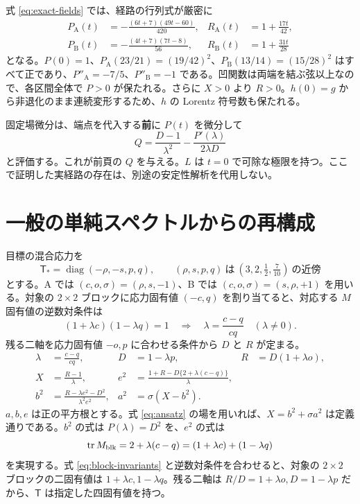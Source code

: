 \documentclass[11pt,a4paper]{article}
\newcommand{\diag}{\operatorname{diag}}
\newcommand{\Tmix}{\mathsf T}
\begin{document}
式 \eqref{eq:exact-fields} では、経路の行列式が厳密に
\begin{equation}\label{eq:exact-paths}
\begin{aligned}
P_{\mathrm A}(t)&=-\frac{(6t+7)(49t-60)}{420},&R_{\mathrm A}(t)&=1+\frac{17t}{42},\\
P_{\mathrm B}(t)&=-\frac{(4t+7)(7t-8)}{56},&R_{\mathrm B}(t)&=1+\frac{31t}{28}
\end{aligned}
\end{equation}
となる。$P(0)=1$、$P_{\mathrm A}(23/21)=(19/42)^2$、$P_{\mathrm B}(13/14)=(15/28)^2$ はすべて正であり、$P''_{\mathrm A}=-7/5$、$P''_{\mathrm B}=-1$ である。凹関数は両端を結ぶ弦以上なので、各区間全体で $P>0$ が保たれる。さらに $X>0$ より $R>0$。$h(0)=g$ から非退化のまま連続変形するため、$h$ の Lorentz 符号数も保たれる。

固定場微分は、端点を代入する\textbf{前}に $P(t)$ を微分して
\begin{equation}\label{eq:Q}
Q=\frac{D-1}{\lambda^2}-\frac{P'(\lambda)}{2\lambda D}
\end{equation}
と評価する。これが前頁の $Q$ を与える。$L$ は $t=0$ で可除な極限を持つ。ここで証明した実経路の存在は、別途の安定性解析を代用しない。

\newpage
\section{一般の単純スペクトルからの再構成}
目標の混合応力を
\begin{equation}\label{eq:targetgeneral}
\Tmix_* =\diag(-\rho,-s,p,q),\qquad
(\rho,s,p,q)\ \text{は}\ (3,2,\tfrac12,\tfrac7{10})\ \text{の近傍}
\end{equation}
とする。A では $(c,o,\sigma)=(\rho,s,-1)$、B では $(c,o,\sigma)=(s,\rho,+1)$ を用いる。対象の $2\times2$ ブロックに応力固有値 $(-c,q)$ を割り当てると、対応する $M$ 固有値の逆数対条件は
\begin{equation}\label{eq:reciprocal}
(1+\lambda c)(1-\lambda q)=1
\quad\Longrightarrow\quad
\lambda=\frac{c-q}{cq}\quad(\lambda\ne0).
\end{equation}
残る二軸を応力固有値 $-o,p$ に合わせる条件から $D$ と $R$ が定まる。
\begin{equation}\label{eq:reconstruction}
\boxed{\begin{aligned}
\lambda&=\frac{c-q}{cq},&D&=1-\lambda p,&R&=D(1+\lambda o),\\
X&=\frac{R-1}{\lambda},&
e^2&=\frac{1+R-D\{2+\lambda(c-q)\}}{\lambda},\\
b^2&=\frac{R-\lambda e^2-D^2}{\lambda^2e^2},&
a^2&=\sigma(X-b^2).
\end{aligned}}
\end{equation}
$a,b,e$ は正の平方根とする。式 \eqref{eq:ansatz} の場を用いれば、$X=b^2+\sigma a^2$ は定義通りである。$b^2$ の式は $P(\lambda)=D^2$ を、$e^2$ の式は
\begin{equation}\label{eq:trace-target}
\operatorname{tr}M_{\rm blk}=2+\lambda(c-q)
=(1+\lambda c)+(1-\lambda q)
\end{equation}
を実現する。式 \eqref{eq:block-invariants} と逆数対条件を合わせると、対象の $2\times2$ ブロックの二固有値は $1+\lambda c,1-\lambda q$。残る二軸は $R/D=1+\lambda o,D=1-\lambda p$ だから、$\Tmix$ は指定した四固有値を持つ。
\end{document}
